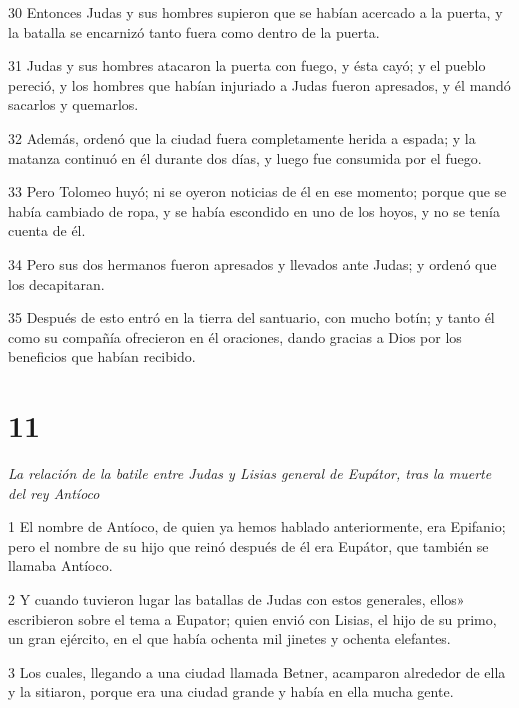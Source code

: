 \par 30 Entonces Judas y sus hombres supieron que se habían acercado a la puerta, y la batalla se encarnizó tanto fuera como dentro de la puerta.

\par 31 Judas y sus hombres atacaron la puerta con fuego, y ésta cayó; y el pueblo pereció, y los hombres que habían injuriado a Judas fueron apresados, y él mandó sacarlos y quemarlos.

\par 32 Además, ordenó que la ciudad fuera completamente herida a espada; y la matanza continuó en él durante dos días, y luego fue consumida por el fuego.

\par 33 Pero Tolomeo huyó; ni se oyeron noticias de él en ese momento; porque que se había cambiado de ropa, y se había escondido en uno de los hoyos, y no se tenía cuenta de él.

\par 34 Pero sus dos hermanos fueron apresados ​​y llevados ante Judas; y ordenó que los decapitaran.

\par 35 Después de esto entró en la tierra del santuario, con mucho botín; y tanto él como su compañía ofrecieron en él oraciones, dando gracias a Dios por los beneficios que habían recibido.


\chapter{11}

\par \textit{La relación de la batile entre Judas y Lisias general de Eupátor, tras la muerte del rey Antíoco}

\par 1 El nombre de Antíoco, de quien ya hemos hablado anteriormente, era Epifanio; pero el nombre de su hijo que reinó después de él era Eupátor, que también se llamaba Antíoco.

\par 2 Y cuando tuvieron lugar las batallas de Judas con estos generales, ellos» escribieron sobre el tema a Eupator; quien envió con Lisias, el hijo de su primo, un gran ejército, en el que había ochenta mil jinetes y ochenta elefantes.

\par 3 Los cuales, llegando a una ciudad llamada Betner, acamparon alrededor de ella y la sitiaron, porque era una ciudad grande y había en ella mucha gente.

